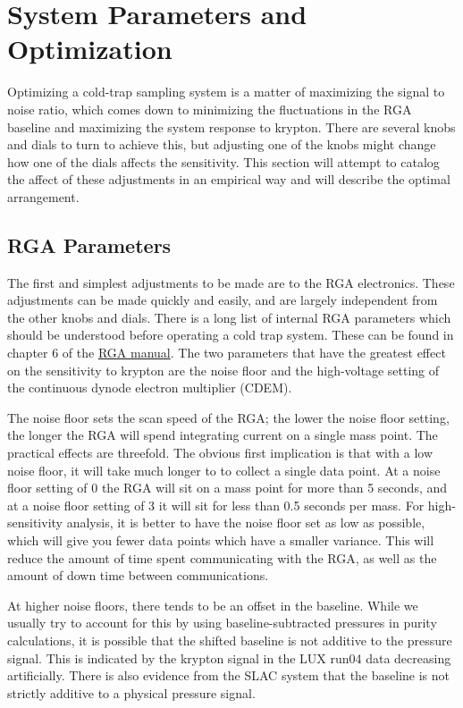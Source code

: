 \documentclass[12pt]{article}
\begin{document}
\section{System Parameters and Optimization}
Optimizing a cold-trap sampling system is a matter of maximizing the signal to noise ratio, which comes down to minimizing the fluctuations in the RGA baseline and maximizing the system response to krypton. There are several knobs and dials to turn to achieve this, but adjusting one of the knobs might change how one of the dials affects the sensitivity. This section will attempt to catalog the affect of these adjustments in an empirical way and will describe the optimal arrangement.
 

\subsection{RGA Parameters} 
The first and simplest adjustments to be made are to the RGA electronics. These adjustments can be made quickly and easily, and are largely independent from the other knobs and dials. There is a long list of internal RGA parameters which should be understood before operating a cold trap system. These can be found in chapter 6 of the \href{http://www.thinksrs.com/downloads/PDFs/Manuals/RGAm.pdf}{RGA manual}. The two parameters that have the greatest effect on the sensitivity to krypton are the noise floor and the high-voltage setting of the continuous dynode electron multiplier (CDEM). 

The noise floor sets the scan speed of the RGA; the lower the noise floor setting, the longer the RGA will spend integrating current on a single mass point. The practical effects are threefold. The obvious first implication is that with a low noise floor, it will take much longer to to collect a single data point. At a noise floor setting of 0 the RGA will sit on a mass point for more than 5 seconds, and at a noise floor setting of 3 it will sit for less than 0.5 seconds per mass. For high-sensitivity analysis, it is better to have the noise floor set as low as possible, which will give you fewer data points which have a smaller variance. This will reduce the amount of time spent communicating with the RGA, as well as the amount of down time between communications. 

{\color{red}At higher noise floors, there tends to be an offset in the baseline. While we usually try to account for this by using baseline-subtracted pressures in purity calculations, it is possible that the shifted baseline is not additive to the pressure signal. This is indicated by the krypton signal in the LUX run04 data decreasing artificially. There is also evidence from the SLAC system that the baseline is not strictly additive to a physical pressure signal.}
\end{document}
